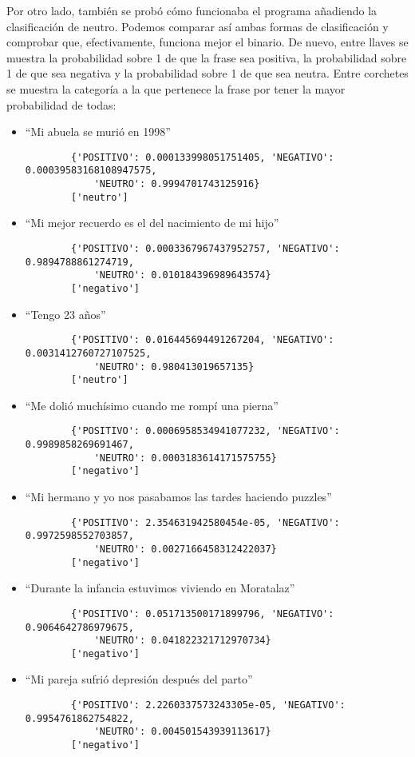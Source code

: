Por otro lado, también se probó cómo funcionaba el programa añadiendo la clasificación de neutro. Podemos comparar así ambas formas de clasificación y comprobar que, efectivamente, funciona mejor el binario. De nuevo, entre llaves se muestra la probabilidad sobre 1 de que la frase sea positiva, la probabilidad sobre 1 de que sea negativa y la probabilidad sobre 1 de que sea neutra. Entre corchetes se muestra la categoría a la que pertenece la frase por tener la mayor probabilidad de todas:

\begin{itemize}
	\item ``Mi abuela se murió en 1998''
	\begin{verbatim}
		{'POSITIVO': 0.000133998051751405, 'NEGATIVO': 0.00039583168108947575,
			'NEUTRO': 0.9994701743125916}
		['neutro']
	\end{verbatim}
	\item ``Mi mejor recuerdo es el del nacimiento de mi hijo''
	\begin{verbatim}
		{'POSITIVO': 0.0003367967437952757, 'NEGATIVO': 0.9894788861274719, 
			'NEUTRO': 0.010184396989643574}
		['negativo']
	\end{verbatim}
	\item ``Tengo 23 años''
	\begin{verbatim}
		{'POSITIVO': 0.016445694491267204, 'NEGATIVO': 0.0031412760727107525, 
			'NEUTRO': 0.980413019657135}
		['neutro']
	\end{verbatim}
	\item ``Me dolió muchísimo cuando me rompí una pierna''
	\begin{verbatim}
		{'POSITIVO': 0.0006958534941077232, 'NEGATIVO': 0.9989858269691467, 
			'NEUTRO': 0.0003183614171575755}
		['negativo']
	\end{verbatim}
	\item ``Mi hermano y yo nos pasabamos las tardes haciendo puzzles''
	\begin{verbatim}
		{'POSITIVO': 2.354631942580454e-05, 'NEGATIVO': 0.9972598552703857, 
			'NEUTRO': 0.0027166458312422037}
		['negativo']
	\end{verbatim}
	\item ``Durante la infancia estuvimos viviendo en Moratalaz''
	\begin{verbatim}
		{'POSITIVO': 0.051713500171899796, 'NEGATIVO': 0.9064642786979675, 
			'NEUTRO': 0.041822321712970734}
		['negativo']
	\end{verbatim}
	\item ``Mi pareja sufrió depresión después del parto''
	\begin{verbatim}
		{'POSITIVO': 2.2260337573243305e-05, 'NEGATIVO': 0.9954761862754822, 
			'NEUTRO': 0.004501543939113617}
		['negativo']
	\end{verbatim}
	
\end{itemize}


